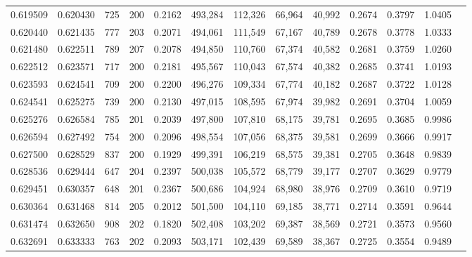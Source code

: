 \begin{tabular}{rrrrrrrrrrrrr}
0.619509 & 0.620430 &    725 &   200 &                                     0.2162 & 493,284 & 112,326 &  66,964 &  40,992 & 0.2674 & 0.3797 & 1.0405 \\
0.620440 & 0.621435 &    777 &   203 &                                     0.2071 & 494,061 & 111,549 &  67,167 &  40,789 & 0.2678 & 0.3778 & 1.0333 \\
0.621480 & 0.622511 &    789 &   207 &                                     0.2078 & 494,850 & 110,760 &  67,374 &  40,582 & 0.2681 & 0.3759 & 1.0260 \\
0.622512 & 0.623571 &    717 &   200 &                                     0.2181 & 495,567 & 110,043 &  67,574 &  40,382 & 0.2685 & 0.3741 & 1.0193 \\
0.623593 & 0.624541 &    709 &   200 &                                     0.2200 & 496,276 & 109,334 &  67,774 &  40,182 & 0.2687 & 0.3722 & 1.0128 \\
0.624541 & 0.625275 &    739 &   200 &                                     0.2130 & 497,015 & 108,595 &  67,974 &  39,982 & 0.2691 & 0.3704 & 1.0059 \\
0.625276 & 0.626584 &    785 &   201 &                                     0.2039 & 497,800 & 107,810 &  68,175 &  39,781 & 0.2695 & 0.3685 & 0.9986 \\
0.626594 & 0.627492 &    754 &   200 &                                     0.2096 & 498,554 & 107,056 &  68,375 &  39,581 & 0.2699 & 0.3666 & 0.9917 \\
0.627500 & 0.628529 &    837 &   200 &                                     0.1929 & 499,391 & 106,219 &  68,575 &  39,381 & 0.2705 & 0.3648 & 0.9839 \\
0.628536 & 0.629444 &    647 &   204 &                                     0.2397 & 500,038 & 105,572 &  68,779 &  39,177 & 0.2707 & 0.3629 & 0.9779 \\
0.629451 & 0.630357 &    648 &   201 &                                     0.2367 & 500,686 & 104,924 &  68,980 &  38,976 & 0.2709 & 0.3610 & 0.9719 \\
0.630364 & 0.631468 &    814 &   205 &                                     0.2012 & 501,500 & 104,110 &  69,185 &  38,771 & 0.2714 & 0.3591 & 0.9644 \\
0.631474 & 0.632650 &    908 &   202 &                                     0.1820 & 502,408 & 103,202 &  69,387 &  38,569 & 0.2721 & 0.3573 & 0.9560 \\
0.632691 & 0.633333 &    763 &   202 &                                     0.2093 & 503,171 & 102,439 &  69,589 &  38,367 & 0.2725 & 0.3554 & 0.9489 \\

\end{tabular}
